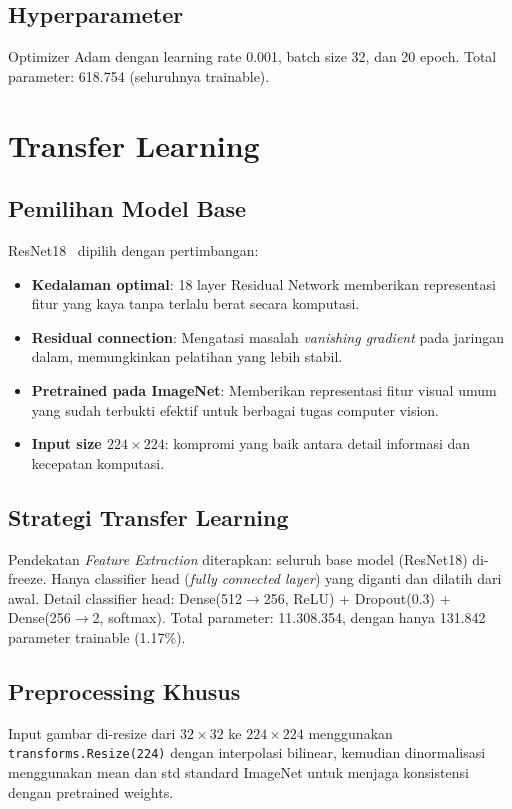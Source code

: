 \documentclass[conference]{IEEEtran}
\begin{document}
\subsection{Hyperparameter}
Optimizer Adam dengan learning rate 0.001, batch size 32, dan 20 epoch. Total parameter: 618.754 (seluruhnya trainable).

\section{Transfer Learning}
\subsection{Pemilihan Model Base}
ResNet18~\cite{he2016} dipilih dengan pertimbangan:
\begin{itemize}
\item \textbf{Kedalaman optimal}: 18 layer Residual Network memberikan representasi fitur yang kaya tanpa terlalu berat secara komputasi.
\item \textbf{Residual connection}: Mengatasi masalah \textit{vanishing gradient} pada jaringan dalam, memungkinkan pelatihan yang lebih stabil.
\item \textbf{Pretrained pada ImageNet}: Memberikan representasi fitur visual umum yang sudah terbukti efektif untuk berbagai tugas computer vision.
\item \textbf{Input size $224\times224$}: kompromi yang baik antara detail informasi dan kecepatan komputasi.
\end{itemize}

\subsection{Strategi Transfer Learning}
Pendekatan \textit{Feature Extraction} diterapkan: seluruh base model (ResNet18) di-freeze. Hanya classifier head (\textit{fully connected layer}) yang diganti dan dilatih dari awal. Detail classifier head: Dense(512$\rightarrow$256, ReLU) + Dropout(0.3) + Dense(256$\rightarrow$2, softmax). Total parameter: 11.308.354, dengan hanya 131.842 parameter trainable (1.17\%).

\subsection{Preprocessing Khusus}
Input gambar di-resize dari $32\times32$ ke $224\times224$ menggunakan \texttt{transforms.Resize(224)} dengan interpolasi bilinear, kemudian dinormalisasi menggunakan mean dan std standard ImageNet untuk menjaga konsistensi dengan pretrained weights.
\end{document}
